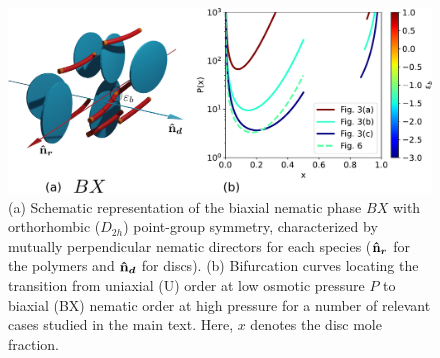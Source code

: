 \begin{subappendices}
\begin{figure}[ht]
  \includegraphics[width=.9 \textwidth]{figures/chapter-2/FIG7}
\caption[Schematic representation of the biaxial nematic phase $BX$ with orthorhombic ($D_{2h}$) point-group  symmetry]{(a) Schematic representation of the biaxial nematic phase $BX$ with orthorhombic ($D_{2h}$) point-group  symmetry, characterized by mutually perpendicular nematic directors for each species ($\bm{\hat{\textnormal{\bfseries n}}_r}$ for the polymers and $\bm{\hat{\textnormal{\bfseries n}}_d}$ for discs). (b) Bifurcation curves locating the transition from uniaxial (U) order at low osmotic pressure $P$ to biaxial (BX) nematic order at high pressure for a number of relevant cases studied in the main text. Here, $x$ denotes the disc mole fraction.  }
\label{fig:bx}
\end{figure}




\end{subappendices}
